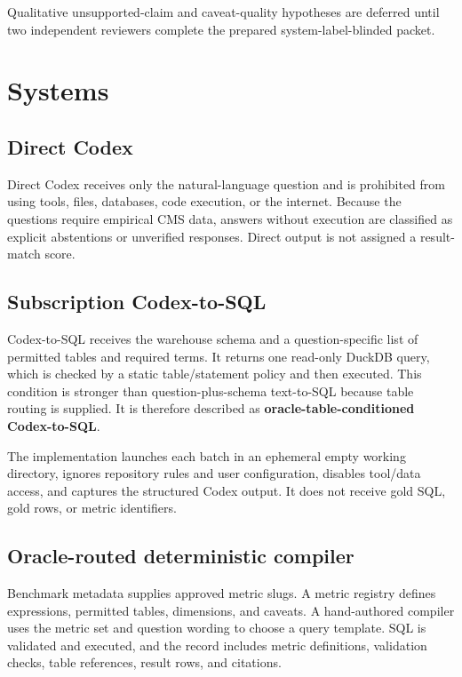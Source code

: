 \documentclass[11pt]{article}
\begin{document}
Qualitative unsupported-claim and caveat-quality hypotheses are deferred until
two independent reviewers complete the prepared system-label-blinded packet.

\section{Systems}

\subsection{Direct Codex}
Direct Codex receives only the natural-language question and is prohibited from
using tools, files, databases, code execution, or the internet. Because the
questions require empirical CMS data, answers without execution are classified as
explicit abstentions or unverified responses. Direct output is not assigned a
result-match score.

\subsection{Subscription Codex-to-SQL}
Codex-to-SQL receives the warehouse schema and a question-specific list of
permitted tables and required terms. It returns one read-only DuckDB query, which
is checked by a static table/statement policy and then executed. This condition
is stronger than question-plus-schema text-to-SQL because table routing is
supplied. It is therefore described as \textbf{oracle-table-conditioned
Codex-to-SQL}.

The implementation launches each batch in an ephemeral empty working directory,
ignores repository rules and user configuration, disables tool/data access, and
captures the structured Codex output. It does not receive gold SQL, gold rows, or
metric identifiers.

\subsection{Oracle-routed deterministic compiler}
Benchmark metadata supplies approved metric slugs. A metric registry defines
expressions, permitted tables, dimensions, and caveats. A hand-authored compiler
uses the metric set and question wording to choose a query template. SQL is
validated and executed, and the record includes metric definitions, validation
checks, table references, result rows, and citations.
\end{document}
